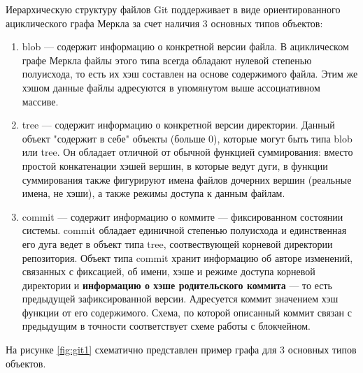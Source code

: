 Иерархическую структуру файлов Git поддерживает в виде ориентированного ациклического графа Меркла за счет наличия 3 основных типов объектов:
\begin{enumerate}
    \item blob --- содержит информацию о конкретной версии файла. В ациклическом графе Меркла файлы этого типа всегда обладают нулевой степенью полуисхода, то есть их хэш составлен на основе содержимого файла. Этим же хэшом данные файлы адресуются в упомянутом выше ассоциативном массиве.
    \item tree --- содержит информацию о конкретной версии директории. Данный объект "содержит в себе" объекты (больше 0), которые могут быть типа blob или tree. Он обладает отличной от обычной функцией суммирования: вместо простой конкатенации хэшей вершин, в которые ведут дуги, в функции суммирования также фигурируют имена файлов дочерних вершин (реальные имена, не хэши), а также режимы доступа к данным файлам.
    \item commit --- содержит информацию о коммите --- фиксированном состоянии системы. commit обладает единичной степенью полуисхода и единственная его дуга ведет в объект типа tree, соотвествующей корневой директории репозитория. Объект типа commit хранит информацию об авторе изменений, связанных с фиксацией, об имени, хэше и режиме доступа корневой директории и \textbf{информацию о хэше родительского коммита} --- то есть предыдущей зафиксированной версии. Адресуется коммит значением хэш функции от его содержимого. Схема, по которой описанный коммит связан с предыдущим в точности соответствует схеме работы с блокчейном.
\end{enumerate}

На рисунке \ref{fig:git1} схематично представлен пример графа для 3 основных типов объектов.

